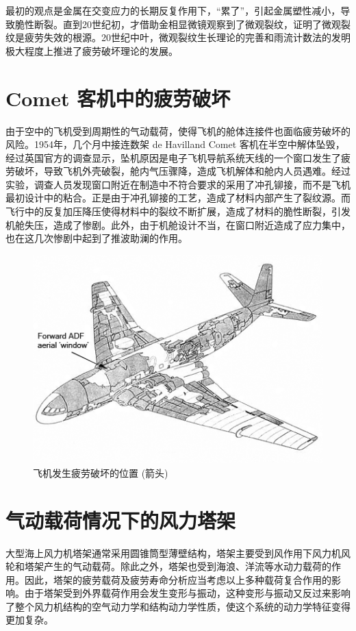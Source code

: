 \documentclass[12pt, a4paper]{ctexart}
\begin{document}
最初的观点是金属在交变应力的长期反复作用下，“累了”，引起金属塑性减小，导致脆性断裂。直到20世纪初，才借助金相显微镜观察到了微观裂纹，证明了微观裂纹是疲劳失效的根源。20世纪中叶，微观裂纹生长理论的完善和雨流计数法的发明极大程度上推进了疲劳破坏理论的发展。


\section{Comet 客机中的疲劳破坏}

由于空中的飞机受到周期性的气动载荷，使得飞机的舱体连接件也面临疲劳破坏的风险。1954年，几个月中接连数架 de Havilland Comet 客机在半空中解体坠毁，经过英国官方的调查显示，坠机原因是电子飞机导航系统天线的一个窗口发生了疲劳破坏，导致飞机外壳破裂，舱内气压骤降，造成飞机解体和舱内人员遇难。经过实验，调查人员发现窗口附近在制造中不符合要求的采用了冲孔铆接，而不是飞机最初设计中的粘合。正是由于冲孔铆接的工艺，造成了材料内部产生了裂纹源。而飞行中的反复加压降压使得材料中的裂纹不断扩展，造成了材料的脆性断裂，引发机舱失压，造成了惨剧。此外，由于机舱设计不当，在窗口附近造成了应力集中，也在这几次惨剧中起到了推波助澜的作用。\citep{wiki:xxx2}

\begin{figure}[ht]	
	\centering
	\includegraphics[scale=1.0]{32.png}
	\caption{飞机发生疲劳破坏的位置 (箭头)}
	\label{fig:label2}
\end{figure}


\section{气动载荷情况下的风力塔架}

大型海上风力机塔架通常采用圆锥筒型薄壁结构，塔架主要受到风作用下风力机风轮和塔架产生的气动载荷。除此之外，塔架也受到海浪、洋流等水动力载荷的作用。因此，塔架的疲劳载荷及疲劳寿命分析应当考虑以上多种载荷复合作用的影响。由于塔架受到外界载荷作用会发生变形与振动，这种变形与振动又反过来影响了整个风力机结构的空气动力学和结构动力学性质，使这个系统的动力学特征变得更加复杂\citep{009}。
\end{document}
